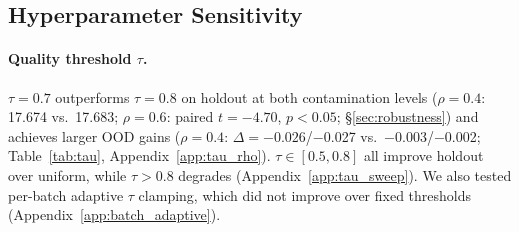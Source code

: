 \begin{table}[t]
\centering
\small
\setlength{\tabcolsep}{3pt}
\caption{Auxiliary baselines at $\rho{=}0.4$. Grid-best selected post-hoc from nine candidates (Appendix~\ref{app:grid}). Golden Ratio requires known $\rho$~\citep{he2025golden}. D\&R uses ${\sim}$3.2 content epochs (Table~\ref{tab:epoch_match}).}
\label{tab:aux}
\end{table}

\subsection{Hyperparameter Sensitivity}
\label{sec:sensitivity}

\paragraph{Quality threshold $\tau$.}
$\tau{=}0.7$ outperforms $\tau{=}0.8$ on holdout at both contamination levels ($\rho{=}0.4$: 17.674 vs.\ 17.683; $\rho{=}0.6$: paired $t{=}{-}4.70$, $p{<}0.05$; \S\ref{sec:robustness}) and achieves larger OOD gains ($\rho{=}0.4$: $\Delta{=}{-}0.026$/$-$0.027 vs.\ $-$0.003/$-$0.002; Table~\ref{tab:tau}, Appendix~\ref{app:tau_rho}).
$\tau \in [0.5, 0.8]$ all improve holdout over uniform, while $\tau {>} 0.8$ degrades (Appendix~\ref{app:tau_sweep}).
We also tested per-batch adaptive $\tau$ clamping, which did not improve over fixed thresholds (Appendix~\ref{app:batch_adaptive}).


